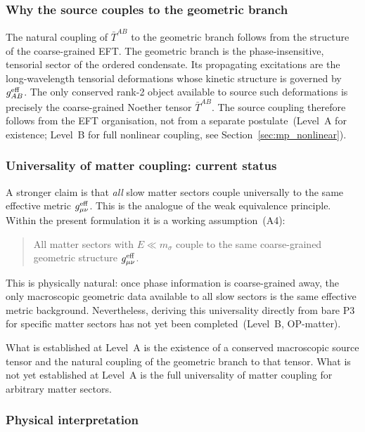 \subsubsection*{Why the source couples to the geometric branch}

The natural coupling of $\bar{T}^{AB}$ to the geometric branch follows
from the structure of the coarse-grained EFT.
The geometric branch is the phase-insensitive, tensorial sector of the
ordered condensate.
Its propagating excitations are the long-wavelength tensorial
deformations whose kinetic structure is governed by $g^{\rm eff}_{AB}$.
The only conserved rank-2 object available to source such deformations
is precisely the coarse-grained Noether tensor $\bar{T}^{AB}$.
The source coupling therefore follows from the EFT organisation, not
from a separate postulate~(Level~A for existence; Level~B for full
nonlinear coupling, see Section~\ref{sec:mp_nonlinear}).

\subsubsection*{Universality of matter coupling: current status}

A stronger claim is that \emph{all} slow matter sectors couple
universally to the same effective metric $g^{\rm eff}_{\mu\nu}$.
This is the analogue of the weak equivalence principle.
Within the present formulation it is a working assumption~(A4):
\begin{quote}
All matter sectors with $E\ll m_\sigma$ couple to the same
coarse-grained geometric structure $g^{\rm eff}_{\mu\nu}$.
\end{quote}
This is physically natural: once phase information is coarse-grained
away, the only macroscopic geometric data available to all slow sectors
is the same effective metric background.
Nevertheless, deriving this universality directly from bare P3 for
specific matter sectors has not yet been completed~(Level~B, OP-matter).

What is established at Level~A is the existence of a conserved
macroscopic source tensor and the natural coupling of the geometric
branch to that tensor.
What is not yet established at Level~A is the full universality of
matter coupling for arbitrary matter sectors.

\subsubsection*{Physical interpretation}

